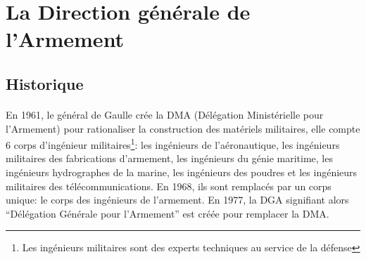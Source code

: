 \documentclass[11pt, book, english, french]{upmethodology-document}
\begin{document}
		\section{La Direction générale de l'Armement}
			\subsection{Historique}
				\paragraph*{}
					En 1961, le général de Gaulle crée la DMA (Délégation Ministérielle pour l'Armement) pour rationaliser la construction des matériels militaires, elle compte 6 corps d'ingénieur militaires\footnote{Les ingénieurs militaires sont des experts techniques au service de la défense}: les ingénieurs de l'aéronautique, les ingénieurs militaires des fabrications d'armement, les ingénieurs du génie maritime, les ingénieurs hydrographes de la marine, les ingénieurs des poudres et les ingénieurs militaires des télécommunications. En 1968, ils sont remplacés par un corps unique: le corps des ingénieurs de l’armement. En 1977, la DGA signifiant alors ``Délégation Générale pour l'Armement'' est créée pour remplacer la DMA.
\end{document}
